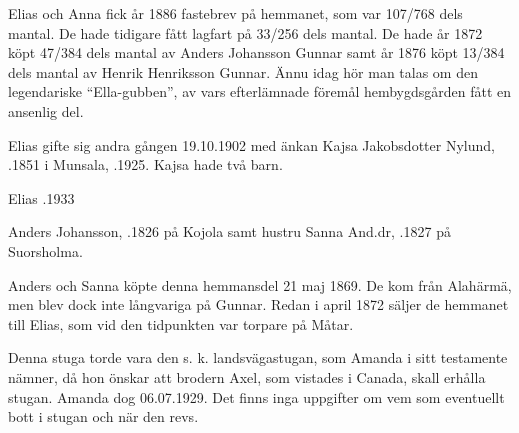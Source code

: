 Elias och Anna fick år 1886 fastebrev på hemmanet, som var 107/768 dels mantal. De hade tidigare fått lagfart på 33/256 dels mantal. De hade år 1872 köpt 47/384 dels mantal av Anders Johansson Gunnar samt år 1876 köpt 13/384 dels mantal av Henrik Henriksson Gunnar. Ännu idag hör man talas om den legendariske ``Ella-gubben'', av vars efterlämnade föremål hembygdsgården fått en ansenlig del.

Elias gifte sig andra gången 19.10.1902 med änkan Kajsa Jakobsdotter Nylund, .1851 i Munsala, .1925. Kajsa hade två barn.
\begin{jhchildren}
  \item {}
  \item {}
\end{jhchildren}

Elias .1933


%
Anders Johansson, .1826 på Kojola samt hustru Sanna And.dr, .1827 på Suorsholma.
\begin{jhchildren}
  \item {}
  \item {}
  \item {}
\end{jhchildren}

Anders och Sanna köpte denna hemmansdel 21 maj 1869. De kom från Alahärmä, men blev dock inte långvariga på Gunnar. Redan i april 1872 säljer de hemmanet till Elias, som vid den tidpunkten var torpare på Måtar.


%


%
Denna stuga torde vara den s. k. landsvägastugan, som Amanda i sitt testamente nämner, då hon önskar att brodern Axel, som vistades i Canada, skall erhålla stugan. Amanda dog 06.07.1929. Det finns inga uppgifter om vem som eventuellt bott i stugan och när den revs.


